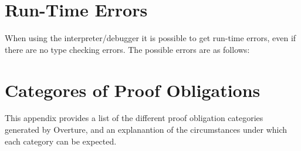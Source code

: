 \documentclass{overturerepchap}
\begin{document}
\newpage
\chapter{Run-Time Errors}\label{app:runtimeerr}

When using the interpreter/debugger it is possible to get run-time
errors, even if there are no type checking errors. The possible errors
are as follows:



\newpage
\chapter{Categores of Proof Obligations}\label{app:POcategories}

This appendix provides a list of the different proof obligation
categories generated by Overture, and an explanantion of the
circumstances under which each category can be expected.
\end{document}
